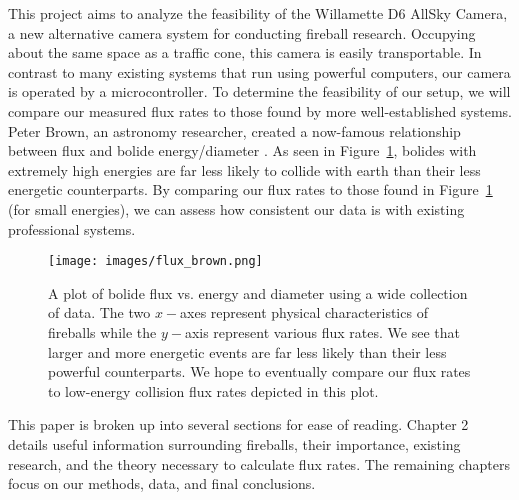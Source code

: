 This project aims to analyze the feasibility of the Willamette D6 AllSky Camera, a new alternative camera system for conducting fireball research. 
Occupying about the same space as a traffic cone, this camera is easily transportable.
In contrast to many existing systems that run using powerful computers, our camera is operated by a microcontroller.
To determine the feasibility of our setup, we will compare our measured flux rates to those found by more well-established systems.
Peter Brown, an astronomy researcher, created a now-famous relationship between flux and bolide energy/diameter \cite{brown_p_flux_2002}.
As seen in Figure~\ref{brown}, bolides with extremely high energies are far less likely to collide with earth than their less energetic counterparts.
By comparing our flux rates to those found in Figure~\ref{brown} (for small energies), we can assess how consistent our data is with existing professional systems.

\begin{figure}[ht!]
  \centering
  \texttt{[image: images/flux\_brown.png]}
  \caption[A plot of bolide flux vs. energy and diameter using a wide collection of data.]{A plot of bolide flux vs. energy and diameter using a wide collection of data.  The two $x-$axes represent physical characteristics of fireballs while the $y-$axis represent various flux rates.  We see that larger and more energetic events are far less likely than their less powerful counterparts.  We hope to eventually compare our flux rates to low-energy collision flux rates depicted in this plot.}
  \label{brown}
\end{figure}

This paper is broken up into several sections for ease of reading. Chapter 2 details useful information surrounding fireballs, their importance, existing research, and the theory necessary to calculate flux rates. 
The remaining chapters focus on our methods, data, and final conclusions.   
